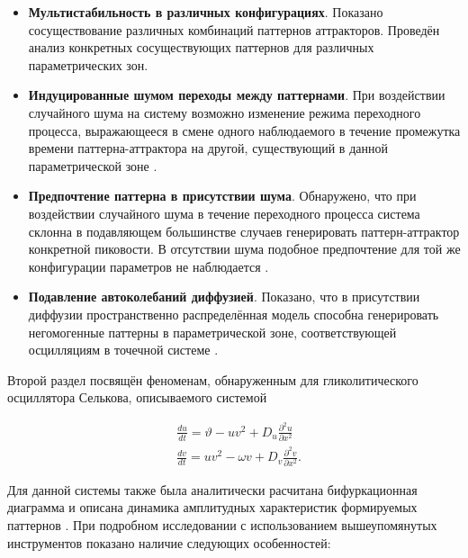 \begin{itemize}
    \item \textbf{Мультистабильность в различных конфигурациях}. Показано сосуществование различных комбинаций паттернов аттракторов. Проведён анализ конкретных сосуществующих паттернов для различных параметрических зон.
    \item \textbf{Индуцированные шумом переходы между паттернами}. При воздействии случайного шума на систему возможно изменение режима переходного процесса, выражающееся в смене одного наблюдаемого в течение промежутка времени паттерна-аттрактора на другой, существующий в данной параметрической зоне \cite{bib1}.
    \item \textbf{Предпочтение паттерна в присутствии шума}. Обнаружено, что при воздействии случайного шума в течение переходного процесса система склонна в подавляющем большинстве случаев генерировать паттерн-аттрактор конкретной пиковости. В отсутствии шума подобное предпочтение для той же конфигурации параметров не наблюдается \cite{bib1}.
    \item \textbf{Подавление автоколебаний диффузией}. Показано, что в присутствии диффузии пространственно распределённая модель способна генерировать негомогенные паттерны в параметрической зоне, соответствующей осцилляциям в точечной системе \cite{bib2}.
\end{itemize}

Второй раздел посвящён феноменам, обнаруженным для гликолитического осциллятора Селькова, описываемого системой

\begin{equation}
    \begin{aligned}
        & \frac{d u}{d t}=\vartheta-u v^2+D_u \frac{\partial^2 u}{\partial x^2} \\
        & \frac{d v}{d t}=u v^2-\omega v+D_v \frac{\partial^2 v}{\partial x^2}.
        \end{aligned}
\end{equation}

Для данной системы также была аналитически расчитана бифуркационная диаграмма и описана динамика амплитудных характеристик формируемых паттернов \cite{bib3}. При подробном исследовании с использованием вышеупомянутых инструментов показано наличие следующих особенностей:

